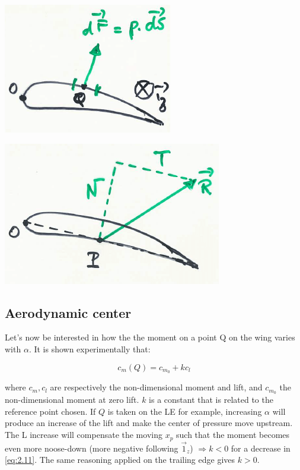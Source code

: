 					\begin{center}
					\begin{minipage}{0.4\textwidth}
					\includegraphics[scale=0.55]{ch2/12}
					\label{fig:2.11}
					\end{minipage}
					\begin{minipage}{0.4\textwidth}
					\includegraphics[scale=0.5]{ch2/13}
					\label{fig:2.12}
					\end{minipage}
					\end{center}
					
		\subsection{Aerodynamic center}
			Let's now be interested in how the the moment on a point Q on the wing varies with $\alpha$. It is shown experimentally that:
			
			\begin{equation}
			c_m(Q) = c_{m_0} + k c_l
			\label{eq:2.11}
			\end{equation}
			
			where $c_m, c_l$ are respectively the non-dimensional moment and lift, and $c_{m_0}$ the non-dimensional moment at zero lift. $k$ is a constant that is related to the reference point chosen. If $Q$ is taken on the LE for example, increasing $\alpha$ will produce an increase of the lift and make the center of pressure move upstream. The L increase will compensate the moving $x_p$ such that the moment becomes even more noose-down (more negative following $\vec{1}_z$) $\Rightarrow k<0$ for a decrease in \eqref{eq:2.11}. The same reasoning applied on the trailing edge gives $k>0$. \\
			

